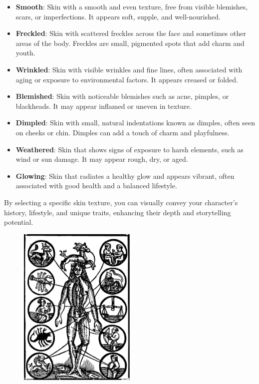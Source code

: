 \documentclass[12pt]{book}  %
\begin{document}
\begin{itemize}
    \item \textbf{Smooth}: Skin with a smooth and even texture, free from visible blemishes, scars, or imperfections. It appears soft, supple, and well-nourished.
    \item \textbf{Freckled}: Skin with scattered freckles across the face and sometimes other areas of the body. Freckles are small, pigmented spots that add charm and youth.
    \item \textbf{Wrinkled}: Skin with visible wrinkles and fine lines, often associated with aging or exposure to environmental factors. It appears creased or folded.
    \item \textbf{Blemished}: Skin with noticeable blemishes such as acne, pimples, or blackheads. It may appear inflamed or uneven in texture.
    \item \textbf{Dimpled}: Skin with small, natural indentations known as dimples, often seen on cheeks or chin. Dimples can add a touch of charm and playfulness.
    \item \textbf{Weathered}: Skin that shows signs of exposure to harsh elements, such as wind or sun damage. It may appear rough, dry, or aged.
    \item \textbf{Glowing}: Skin that radiates a healthy glow and appears vibrant, often associated with good health and a balanced lifestyle.
\end{itemize}

By selecting a specific skin texture, you can visually convey your character's history, lifestyle, and unique traits, enhancing their depth and storytelling potential.


\begin{figure}[h]
    \centering
    \includegraphics[width=0.5\textwidth]{./images/physical_01.pdf}
\end{figure}
\end{document}
